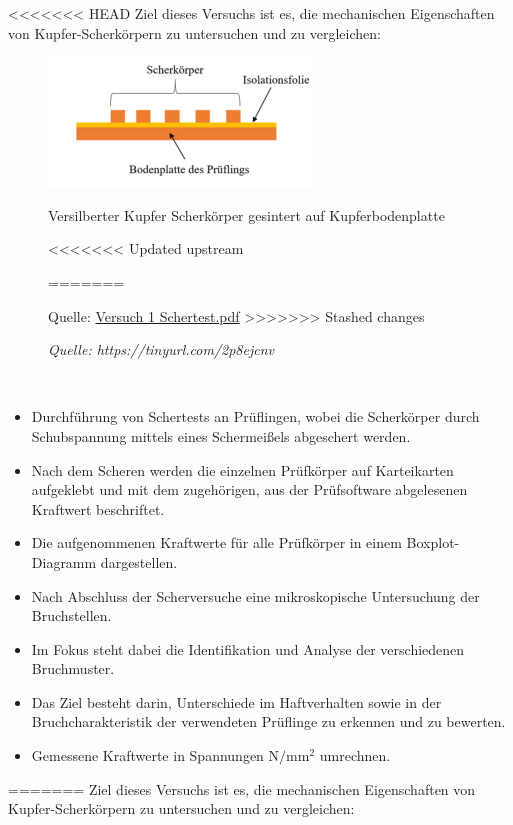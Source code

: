<<<<<<< HEAD
Ziel dieses Versuchs ist es, die mechanischen Eigenschaften von Kupfer-Scherkörpern zu untersuchen und zu vergleichen:
\\
\vspace{0.05cm}
\begin{figure}[h]
    \centering
    \includegraphics[scale=0.95]{Bilder/schematik.png}
    \caption{Versilberter Kupfer Scherkörper gesintert auf Kupferbodenplatte}
<<<<<<< Updated upstream
    \caption*{\textit{Quelle: https://tinyurl.com/2p8ejcnv}}
=======
    \par Quelle: \href{https://learn.fh-kiel.de/mod/folder/view.php?id=160797}{Versuch 1 Schertest.pdf}
>>>>>>> Stashed changes
    \vspace{0.2cm}
    \label{Abb.2: Versilberter Kupfer Scherkörper gesintert auf Kupferbodenplatte} 
\end{figure}\\

\begin{itemize}
\item Durchführung von Schertests an Prüflingen, wobei die Scherkörper durch Schubspannung mittels eines Schermeißels abgeschert werden.
\item Nach dem Scheren werden die einzelnen Prüfkörper auf Karteikarten aufgeklebt und mit dem zugehörigen, aus der Prüfsoftware abgelesenen Kraftwert beschriftet.
\item Die aufgenommenen Kraftwerte für alle Prüfkörper in einem Boxplot-Diagramm dargestellen.
\item Nach Abschluss der Scherversuche eine mikroskopische Untersuchung der Bruchstellen.
\item Im Fokus steht dabei die Identifikation und Analyse der verschiedenen Bruchmuster.
\item Das Ziel besteht darin, Unterschiede im Haftverhalten sowie in der Bruchcharakteristik der verwendeten Prüflinge zu erkennen und zu bewerten.
\item Gemessene Kraftwerte in Spannungen $\mathrm{N/mm^2}$  umrechnen.
\end{itemize}
=======
Ziel dieses Versuchs ist es, die mechanischen Eigenschaften von Kupfer-Scherkörpern zu untersuchen und zu vergleichen:\\
